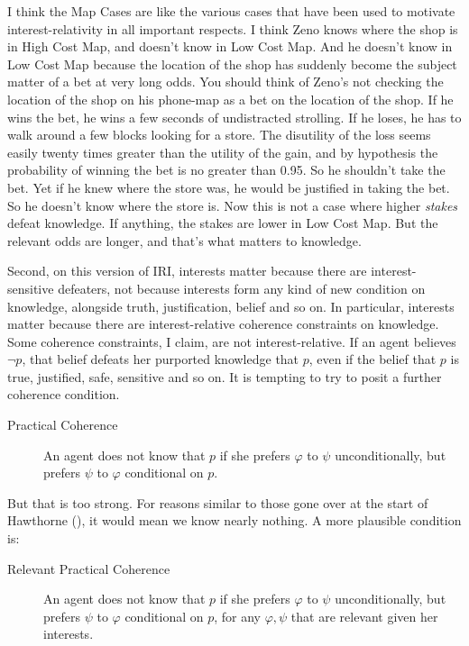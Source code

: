 \documentclass[
  11pt,
  letterpaper,
  DIV=11,
  numbers=noendperiod,
  oneside]{scrartcl}
\begin{document}
I think the Map Cases are like the various cases that have been used to
motivate interest-relativity in all important
respects. I think Zeno knows where the shop is in High Cost Map, and
doesn't know in Low Cost Map. And he doesn't know in Low Cost Map
because the location of the shop has suddenly become the subject matter
of a bet at very long odds. You should think of Zeno's not checking the
location of the shop on his phone-map as a bet on the location of the
shop. If he wins the bet, he wins a few seconds of undistracted
strolling. If he loses, he has to walk around a few blocks looking for a
store. The disutility of the loss seems easily twenty times greater than
the utility of the gain, and by hypothesis the probability of winning
the bet is no greater than 0.95. So he shouldn't take the bet. Yet if he
knew where the store was, he would be justified in taking the bet. So he
doesn't know where the store is. Now this is not a case where higher
\emph{stakes} defeat knowledge. If anything, the stakes are lower in Low
Cost Map. But the relevant odds are longer, and that's what matters to
knowledge.

Second, on this version of IRI, interests matter because there are
interest-sensitive defeaters, not because interests form any kind of new
condition on knowledge, alongside truth, justification, belief and so
on. In particular, interests matter because there are interest-relative
coherence constraints on knowledge. Some coherence constraints, I claim,
are not interest-relative. If an agent believes \(\neg p\), that belief
defeats her purported knowledge that \(p\), even if the belief that
\(p\) is true, justified, safe, sensitive and so on. It is tempting to
try to posit a further coherence condition.

\begin{description}
\item[Practical Coherence]
An agent does not know that \(p\) if she prefers \(\varphi\) to \(\psi\)
unconditionally, but prefers \(\psi\) to \(\varphi\) conditional on
\(p\).
\end{description}

But that is too strong. For reasons similar to those gone over at the
start of Hawthorne (), it would mean
we know nearly nothing. A more plausible condition is:

\begin{description}
\item[Relevant Practical Coherence]
An agent does not know that \(p\) if she prefers \(\varphi\) to \(\psi\)
unconditionally, but prefers \(\psi\) to \(\varphi\) conditional on
\(p\), for any \(\varphi, \psi\) that are relevant given her interests.
\end{description}
\end{document}
